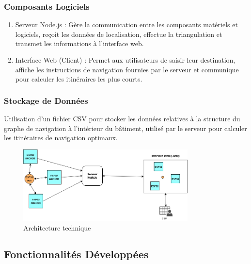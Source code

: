 \documentclass{article}
\begin{document}
\subsubsection{Composants Logiciels}
\begin{enumerate}
    \item Serveur Node.js : Gère la communication entre les composants matériels et logiciels, reçoit les données de localisation, effectue la triangulation et transmet les informations à l'interface web.
    \item Interface Web (Client) : Permet aux utilisateurs de saisir leur destination, affiche les instructions de navigation fournies par le serveur et communique pour calculer les itinéraires les plus courts.
\end{enumerate}

\subsubsection{Stockage de Données}
Utilisation d'un fichier CSV pour stocker les données relatives à la structure du graphe de navigation à l'intérieur du bâtiment, utilisé par le serveur pour calculer les itinéraires de navigation optimaux.


\begin{figure}[h!]
    \centering
    \includegraphics[width=0.8\textwidth]{architecture_globale.png}
    \caption{Architecture technique}
    \label{fig:architecture}
\end{figure}

\subsection{Fonctionnalités Développées}
\end{document}
